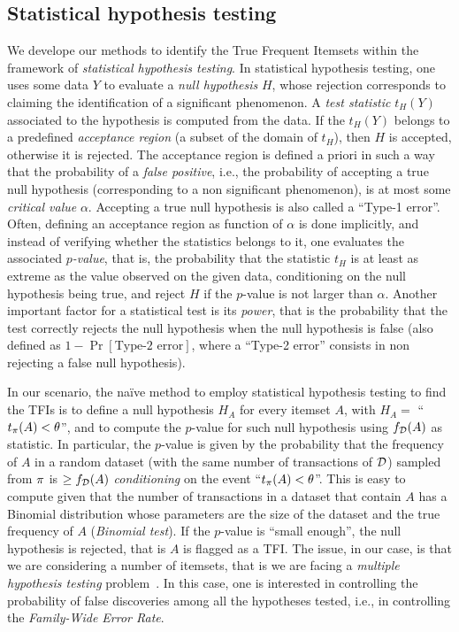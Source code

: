 \subsection{Statistical hypothesis testing}\label{sec:stat_tests}
We develope our methods to identify the True Frequent Itemsets within the
framework of \emph{statistical
hypothesis testing}. In statistical hypothesis testing, one uses some data
$Y$ to evaluate a \emph{null hypothesis} $H$, whose rejection corresponds to claiming
the identification of a significant phenomenon. A \emph{test statistic} $t_H(Y)$ associated
to the hypothesis is computed from the data. If the $t_H(Y)$ belongs to a predefined
\emph{acceptance region} (a subset of the domain of $t_H$), then $H$ is
accepted, otherwise it is rejected. The acceptance region is defined a priori
in such a way that the probability of a \emph{false positive}, i.e., the
probability of accepting a true null hypothesis (corresponding to a non significant 
phenomenon), is at most some \emph{critical
value} $\alpha$. Accepting a true null hypothesis is also called a ``Type-1
error''. Often, defining an acceptance region as function of $\alpha$ is done
implicitly, and instead of verifying whether the statistics belongs to it, one
evaluates the associated \emph{$p$-value}, that is, the probability that the
statistic $t_H$ is at least as extreme as the value observed on the given data,
conditioning on the null hypothesis being true, and reject $H$ if the $p$-value
is not larger than $\alpha$. Another important factor for a
statistical test is its \emph{power}, that is the probability that the test
correctly rejects the null hypothesis when the null hypothesis is false (also
defined as $1-\Pr[\text{Type-2 error}]$, where a ``Type-2 error'' consists in
non rejecting a false null hypothesis).

In our scenario, the na\"{i}ve method to employ statistical hypothesis testing
to find the TFIs is to define a null hypothesis $H_A$ for every itemset $A$,
with $H_A =$ ``$t_\pi(A) < \theta$'', and to compute the $p$-value for such null
hypothesis using $f_{\cal D} (A)$ as statistic. In particular, the $p$-value is given
by the probability that the frequency of $A$ in a random dataset (with the same
number of transactions of ${\cal D}$) sampled from $\pi$ is $\ge f_{\cal D} (A)$
\emph{conditioning} on the event ``$t_\pi(A)< \theta$''. This is easy to
compute given that the number of transactions in a dataset that contain $A$ has
a Binomial distribution whose parameters are the size of the dataset and the
true frequency of $A$ (\emph{Binomial test}). If the $p$-value is ``small enough'', the
null hypothesis is rejected, that is $A$ is flagged as a TFI. The issue, in
our case, is that we are considering a number of itemsets, that is we are facing a
\emph{multiple hypothesis testing} problem~\cite{LiuZW11}. In this case, one is
interested in controlling the probability of false discoveries among all the
hypotheses tested, i.e., in controlling the \emph{Family-Wide Error Rate}.

